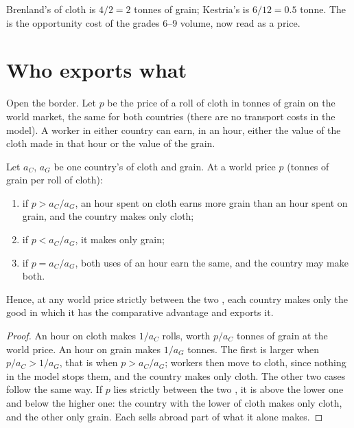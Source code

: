 Brenland's  of cloth is $4/2 = 2$ tonnes of grain; Kestria's is $6/12 = 0.5$ tonne. The
 is the opportunity cost of the grades 6--9 volume, now read as a price.

\section{Who exports what}\label{sec:g10:ricardo-model:pattern}

Open the border. Let $p$ be the price of a roll of cloth in tonnes of grain on the world market, the same
for both countries (there are no transport costs in the model). A worker in either country can earn, in
an hour, either the value of the cloth made in that hour or the value of the grain.

\begin{proposition}\label{prop:g10:ricardo-model:pattern}
Let $a_C$, $a_G$ be one country's  of cloth and grain. At a world price $p$ (tonnes
of grain per roll of cloth):
\begin{enumerate}
\item if $p > a_C/a_G$, an hour spent on cloth earns more grain than an hour spent on grain, and the country
  makes only cloth;
\item if $p < a_C/a_G$, it makes only grain;
\item if $p = a_C/a_G$, both uses of an hour earn the same, and the country may make both.
\end{enumerate}
Hence, at any world price strictly between the two , each country makes only the good in
which it has the comparative advantage and exports it.
\end{proposition}
\begin{proof}
An hour on cloth makes $1/a_C$ rolls, worth $p/a_C$ tonnes of grain at the world price. An hour on grain
makes $1/a_G$ tonnes. The first is larger when $p/a_C > 1/a_G$, that is when $p > a_C/a_G$; workers then
move to cloth, since nothing in the model stops them, and the country makes only cloth. The other two cases
follow the same way. If $p$ lies strictly between the two , it is above the lower one and below
the higher one: the country with the lower  of cloth makes only cloth, and the other only
grain. Each sells abroad part of what it alone makes.
\end{proof}

